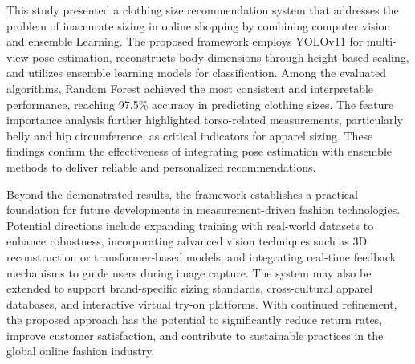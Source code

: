 \documentclass{llncs}
\begin{document}
This study presented a clothing size recommendation system that addresses the problem of inaccurate sizing in online shopping by combining computer vision and ensemble Learning. 
The proposed framework employs YOLOv11 for multi-view pose estimation, reconstructs body dimensions through height-based scaling, and utilizes ensemble learning models for classification. 
Among the evaluated algorithms, Random Forest achieved the most consistent and interpretable performance, reaching 97.5\% accuracy in predicting clothing sizes. 
The feature importance analysis further highlighted torso-related measurements, particularly belly and hip circumference, as critical indicators for apparel sizing. 
These findings confirm the effectiveness of integrating pose estimation with ensemble methods to deliver reliable and personalized recommendations.

Beyond the demonstrated results, the framework establishes a practical foundation for future developments in measurement-driven fashion technologies. 
Potential directions include expanding training with real-world datasets to enhance robustness, incorporating advanced vision techniques such as 3D reconstruction or transformer-based models, 
    and integrating real-time feedback mechanisms to guide users during image capture. The system may also be extended to support brand-specific sizing standards, cross-cultural apparel databases, 
    and interactive virtual try-on platforms. 
With continued refinement, the proposed approach has the potential to significantly reduce return rates, improve customer satisfaction, and contribute to sustainable practices in the global online fashion industry.


 

\end{document}

